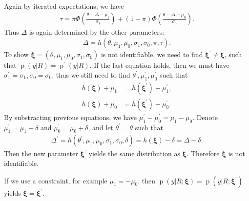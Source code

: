 \documentclass[12pt]{article}
\DeclareMathOperator{\pr}{p}
\begin{document}
Again by iterated expectations, we have
\begin{align*}
  \tau = \pi \Phi \left( \frac{\theta - \Delta - \mu_1}{\sigma_1}
  \right) + (1 - \pi) \Phi \left( \frac{\theta - \Delta -
      \mu_0}{\sigma_0} \right).
\end{align*}
Thus $\Delta$ is again determined by the other parameters:
\begin{align*}
  \Delta = h(\theta, \mu_1, \mu_0, \sigma_1, \sigma_0, \pi, \tau).
\end{align*}
To show $\bm \xi = (\theta, \mu_1, \mu_0, \sigma_1, \sigma_0)$ is not
identifiable, we need to find $\bm \xi^{'} \neq \bm \xi$, such that
$\pr(y|R) = \pr^{'}(y|R)$. If the last equation holds, then we must
have $\sigma_1^{'} = \sigma_1, \sigma_0^{'} = \sigma_0$, thus we still
need to find $\theta^{'}, \mu_1^{'}, \mu_0^{'}$ such that
\begin{align*}
  h(\bm \xi) + \mu_1 & = h(\bm \xi^{'}) + \mu_1^{'},\\
  h(\bm \xi) + \mu_0 & = h(\bm \xi^{'}) + \mu_0^{'}.
\end{align*}
By substracting previous equations, we have $\mu_1^{'}- \mu_0^{'} =
\mu_1- \mu_0$. Denote $\mu_1^{'} = \mu_1 + \delta$ and $\mu_0^{'} =
\mu_0 + \delta$, and let $\theta^{'} = \theta$ such that
\begin{align*}
  \Delta^{'} = h(\theta^{'}, \mu_1, \mu_0, \sigma_1, \sigma_0, \delta)
  = h(\bm \xi) - \delta = \Delta - \delta.
\end{align*}
Then the new parameter $\bm \xi^{'}$ yields the same distribution as
$\bm \xi$. Therefore $\bm \xi$ is not identifiable.

If we use a constraint, for example $\mu_1 = -\mu_0$, then
$\pr(y|R;\bm \xi) = \pr(y|R; \bm \xi^{'})$ yields $\bm \xi = \bm
\xi^{'}$.
\end{document}
